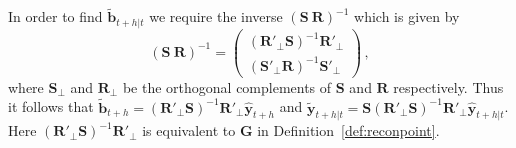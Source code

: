 \documentclass[a4paper, 11pt]{article}
\begin{document}

In order to find $\tilde{\bm{b}}_{t+h|t}$ we require the inverse $(\bm{S} ~ \bm{R})^{-1}$ which is given by
\begin{equation}
(\bm{S} ~  \bm{R})^{-1} = \begin{pmatrix}
(\bm{R}'_\bot \bm{S})^{-1}\bm{R}'_\bot \\ (\bm{S}'_\bot \bm{R})^{-1}\bm{S}'_\bot
\end{pmatrix}\,,
\end{equation}
where $\bm{S}_{\bot}$ and $\bm{R}_{\bot}$ be the orthogonal complements of $\bm{S}$ and $\bm{R}$
respectively. Thus it follows that $\tilde{\bm{b}}_{t+h}=(\bm{R}'_\bot \bm{S})^{-1}\bm{R}'_\bot \hat{\bm{y}}_{t+h}$ and $\tilde{\bm{y}}_{t+h|t}=\bm{S}(\bm{R}'_\bot \bm{S})^{-1}\bm{R}'_\bot \hat{\bm{y}}_{t+h|t}$.  Here $(\bm{R}'_\bot \bm{S})^{-1}\bm{R}'_\bot$ is equivalent to $\bm{G}$ in Definition~\ref{def:reconpoint}.


%
\end{document}
